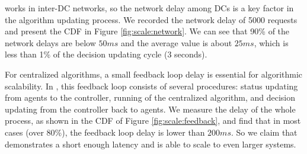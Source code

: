  \name works in inter-DC networks, so the network delay among DCs is a key factor in the algorithm updating process. We recorded the network delay of 5000 requests and present the CDF in Figure \ref{fig:scale:network}. We can see that 90\% of the network delays are below $50ms$ and the average value is about $25ms$, which is less than 1\% of the decision updating cycle (3 seconds).

 For centralized algorithms, a small feedback loop delay is essential for algorithmic scalability. In \name, this feedback loop consists of several procedures: status updating from agents to the controller, running of the centralized algorithm, and decision updating from the controller back to agents. We measure the delay of the whole process, as shown in the CDF of Figure \ref{fig:scale:feedback}, and find that in most cases (over 80\%), the feedback loop delay is lower than $200ms$. So we claim that \name demonstrates a short enough latency and is able to scale to even larger systems.

